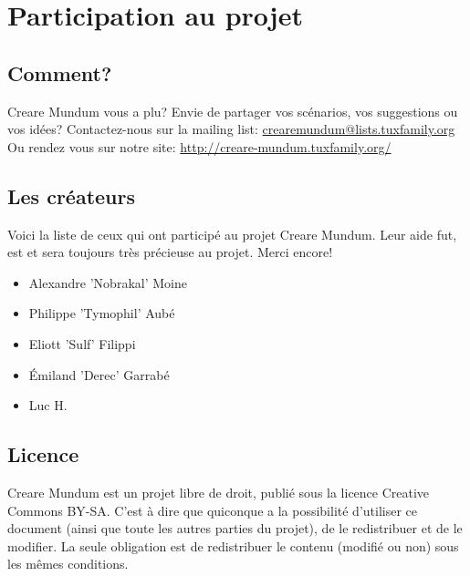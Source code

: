 \documentclass[a4paper]{article}
\begin{document}

\newpage
\section{Participation au projet}
\subsection{Comment?}
\hypertarget{participation}{}
Creare Mundum vous a plu? 
Envie de partager vos scénarios, vos suggestions ou vos idées?
\newline
Contactez-nous sur la mailing list: \href {mailto:crearemundum@lists.tuxfamily.org}{crearemundum@lists.tuxfamily.org}
\newline
Ou rendez vous sur notre site: \href {http://creare-mundum.tuxfamily.org/} {http://creare-mundum.tuxfamily.org/}
\subsection{Les créateurs}
Voici la liste de ceux qui ont participé au projet Creare Mundum. Leur aide fut, est et sera toujours très précieuse au projet. Merci encore!  
\begin{itemize}
\item Alexandre ’Nobrakal’ Moine 
\item Philippe ’Tymophil’ Aubé 
\item Eliott ’Sulf’ Filippi
\item Émiland ’Derec’ Garrabé
\item Luc H.
\end{itemize}
\subsection{Licence}
Creare Mundum est un projet libre de droit, publié sous la licence Creative Commons BY-SA. C'est à dire que quiconque a la possibilité d'utiliser ce document (ainsi que toute les autres parties du projet), de le redistribuer et de le modifier. La seule obligation est de redistribuer le contenu (modifié ou non) sous les mêmes conditions.
\end{document}
